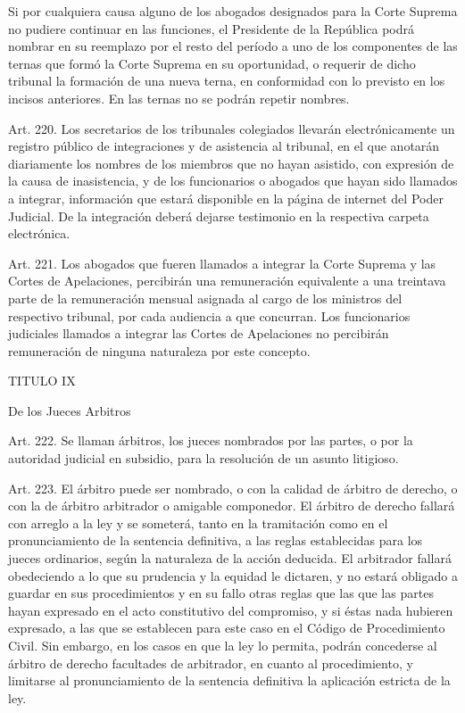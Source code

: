     Si por cualquiera causa alguno de los abogados designados para la Corte Suprema no pudiere continuar en las funciones, el Presidente de la República podrá nombrar en su reemplazo por el resto del período a uno de los componentes de las ternas que formó la Corte Suprema en su oportunidad, o requerir de dicho tribunal la formación de una nueva terna, en conformidad con lo previsto en los incisos anteriores.
    En las ternas no se podrán repetir nombres.



    Art. 220. Los secretarios de los tribunales colegiados llevarán electrónicamente un registro público de integraciones y de asistencia al tribunal, en el que anotarán diariamente los nombres de los miembros que no hayan asistido, con expresión de la causa de inasistencia, y de los funcionarios o abogados que hayan sido llamados a integrar, información que estará disponible en la página de internet del Poder Judicial.
    De la integración deberá dejarse testimonio en la respectiva carpeta electrónica.



    Art. 221. Los abogados que fueren llamados a integrar la Corte Suprema y las Cortes de Apelaciones, percibirán una remuneración equivalente a una treintava parte de la remuneración mensual asignada al cargo de los ministros del respectivo tribunal, por cada audiencia a que concurran.
    Los funcionarios judiciales llamados a integrar las Cortes de Apelaciones no percibirán remuneración de ninguna naturaleza por este concepto.


    TITULO IX

    De los Jueces Arbitros

    Art. 222. Se llaman árbitros, los jueces nombrados por las partes, o por la autoridad judicial en subsidio, para la resolución de un asunto litigioso.



    Art. 223. El árbitro puede ser nombrado, o con la calidad de árbitro de derecho, o con la de árbitro arbitrador o amigable componedor.
    El árbitro de derecho fallará con arreglo a la ley y se someterá, tanto en la tramitación como en el pronunciamiento de la sentencia definitiva, a las reglas establecidas para los jueces ordinarios, según la naturaleza de la acción deducida.
    El arbitrador fallará obedeciendo a lo que su prudencia y la equidad le dictaren, y no estará obligado a guardar en sus procedimientos y en su fallo otras reglas que las que las partes hayan expresado en el acto constitutivo del compromiso, y si éstas nada hubieren expresado, a las que se establecen para este caso en el Código de Procedimiento Civil.
    Sin embargo, en los casos en que la ley lo permita, podrán concederse al árbitro de derecho facultades de arbitrador, en cuanto al procedimiento, y limitarse al pronunciamiento de la sentencia definitiva la aplicación estricta de la ley.

